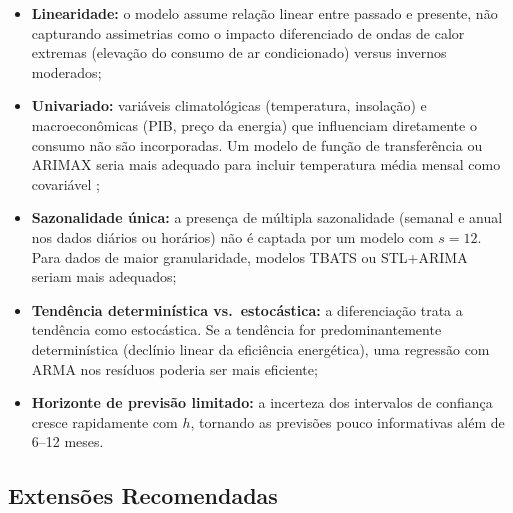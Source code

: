 \documentclass[12pt, a4paper]{article}
\begin{document}
\begin{itemize}
  \item \textbf{Linearidade:} o modelo assume relação linear entre passado e presente,
    não capturando assimetrias como o impacto diferenciado de ondas de calor extremas
    (elevação do consumo de ar condicionado) versus invernos moderados;
  \item \textbf{Univariado:} variáveis climatológicas (temperatura, insolação) e
    macroeconômicas (PIB, preço da energia) que influenciam diretamente o consumo não
    são incorporadas. Um modelo de função de transferência ou ARIMAX seria mais
    adequado para incluir temperatura média mensal como covariável
    \cite{SeriesTemporaisMoretti};
  \item \textbf{Sazonalidade única:} a presença de múltipla sazonalidade (semanal
    e anual nos dados diários ou horários) não é captada por um modelo com $s=12$.
    Para dados de maior granularidade, modelos TBATS ou STL+ARIMA seriam mais
    adequados;
  \item \textbf{Tendência determinística vs.\ estocástica:} a diferenciação trata a
    tendência como estocástica. Se a tendência for predominantemente determinística
    (declínio linear da eficiência energética), uma regressão com ARMA nos resíduos
    poderia ser mais eficiente;
  \item \textbf{Horizonte de previsão limitado:} a incerteza dos intervalos de
    confiança cresce rapidamente com $h$, tornando as previsões pouco informativas
    além de 6--12 meses.
\end{itemize}

\subsection{Extensões Recomendadas}
\end{document}
